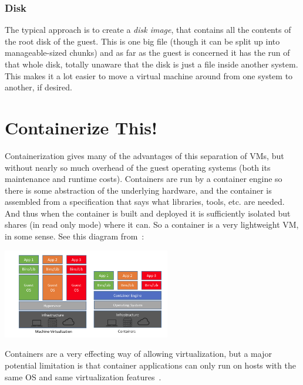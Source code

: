 \subsubsection*{Disk}

The typical approach is to create a \textit{disk image}, that contains all the contents of the root disk of the guest. This is one big file (though it can be split up into manageable-sized chunks) and as far as the guest is concerned it has the run of that whole disk, totally unaware that the disk is just a file inside another system. This makes it a lot easier to move a virtual machine around from one system to another, if desired.

\section*{Containerize This!}

Containerization gives many of the advantages of this separation of VMs, but without nearly so much overhead of the guest operating systems (both its maintenance and runtime costs). Containers are run by a container engine so there is some abstraction of the underlying hardware, and the container is assembled from a specification that says what libraries, tools, etc. are needed. And thus when the container is built and deployed it is sufficiently isolated but shares (in read only mode) where it can. So a container is a very lightweight VM, in some sense. See this diagram from~\cite{netappcontainer}:

\begin{center}
	\includegraphics[width=0.55\textwidth]{images/cvm.png}
\end{center}

Containers are a very effecting way of allowing virtualization, but a major potential limitation is that container applications can only run on hosts with the same OS and same virtualization features~\cite{osi}.




